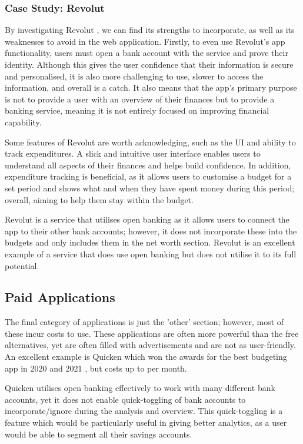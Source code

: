 \subsubsection{Case Study: Revolut}
By investigating Revolut \cite{RevolutWebsite}, we can find its strengths to incorporate, as well as its weaknesses to avoid in the web application. Firstly, to even use Revolut's app functionality, users must open a bank account with the service and prove their identity. Although this gives the user confidence that their information is secure and personalised, it is also more challenging to use, slower to access the information, and overall is a catch. It also means that the app's primary purpose is not to provide a user with an overview of their finances but to provide a banking service, meaning it is not entirely focused on improving financial capability.

Some features of Revolut are worth acknowledging, such as the UI and ability to track expenditures. A slick and intuitive user interface enables users to understand all aspects of their finances and helps build confidence. In addition, expenditure tracking is beneficial, as it allows users to customise a budget for a set period and shows what and when they have spent money during this period; overall, aiming to help them stay within the budget.

Revolut is a service that utilises open banking as it allows users to connect the app to their other bank accounts; however, it does not incorporate these into the budgets and only includes them in the net worth section. Revolut is an excellent example of a service that does use open banking but does not utilise it to its full potential.

\subsection{Paid Applications}
\label{sec:paid-applications}
The final category of applications is just the 'other' section; however, most of these incur costs to use. These applications are often more powerful than the free alternatives, yet are often filled with advertisements and are not as user-friendly. An excellent example is Quicken which won the awards for the best budgeting app in 2020 and 2021 \cite{Quicken}, but costs up to  per month.

Quicken utilises open banking effectively to work with many different bank accounts, yet it does not enable quick-toggling of bank accounts to incorporate/ignore during the analysis and overview. This quick-toggling is a feature which would be particularly useful in giving better analytics, as a user would be able to segment all their savings accounts.

